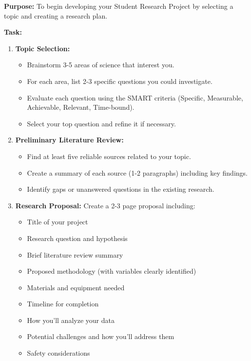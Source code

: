 \documentclass[justified,notoc]{tufte-book}
\newenvironment{investigation}[1]{%
    \begin{tcolorbox}[colback=info!10,colframe=info,title=\textbf{Investigation: #1}]
}{%
    \end{tcolorbox}
}
\begin{document}
\begin{investigation}{Planning Your Student Research Project}
\textbf{Purpose:} To begin developing your Student Research Project by selecting a topic and creating a research plan.

\textbf{Task:}
\begin{enumerate}
    \item \textbf{Topic Selection:} 
    \begin{itemize}
        \item Brainstorm 3-5 areas of science that interest you.
        \item For each area, list 2-3 specific questions you could investigate.
        \item Evaluate each question using the SMART criteria (Specific, Measurable, Achievable, Relevant, Time-bound).
        \item Select your top question and refine it if necessary.
    \end{itemize}
    
    \item \textbf{Preliminary Literature Review:} 
    \begin{itemize}
        \item Find at least five reliable sources related to your topic.
        \item Create a summary of each source (1-2 paragraphs) including key findings.
        \item Identify gaps or unanswered questions in the existing research.
    \end{itemize}
    
    \item \textbf{Research Proposal:} Create a 2-3 page proposal including:
    \begin{itemize}
        \item Title of your project
        \item Research question and hypothesis
        \item Brief literature review summary
        \item Proposed methodology (with variables clearly identified)
        \item Materials and equipment needed
        \item Timeline for completion
        \item How you'll analyze your data
        \item Potential challenges and how you'll address them
        \item Safety considerations
    \end{itemize}
    

\end{enumerate}
\end{investigation}
\end{document}
